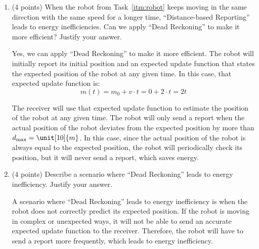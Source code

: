 \documentclass[12pt]{article}
\begin{document}
\begin{ejercicio}[14 points]
\begin{enumerate}[label=\alph*)]
\begin{enumerate}
                    The sleep time is calculated as follows:
                    \begin{equation*}
                        T_3 = \frac{d_{\max} - \text{distance}(m_3, m_{\text{last}})}{v_{\max}} = \frac{10 - 8.75}{4} = \unit[0.3125]{s}
                    \end{equation*}
                    Therefore, the robot will sleep for $T_3 = \unit[0.3125]{s}$, and it will wake up at $t = \unit[4.6875]{s}$.
                \end{enumerate}

                It should be noted however that the robot will not send a report until he reaches the maximum distance of $d_{\max} = \unit[10]{m}$ from the last reported position. Before that, he will only measure his current position and calculate the sleep time.
            \item (4 points) When the robot from Task~\ref{itm:robot} keeps moving in the same direction with the same speed for a longer time, ``Distance-based Reporting'' leads to energy inefficiencies. Can we apply ``Dead Reckoning'' to make it more efficient? Justify your answer.
            
            Yes, we can apply ``Dead Reckoning'' to make it more efficient. The robot will initially report its initial position and an expected update function that states the expected position of the robot at any given time. In this case, that expected update function is:
            $$ m(t) = m_0 + v \cdot t = 0 + 2 \cdot t = 2t $$
            
            The receiver will use that expected update function to estimate the position of the robot at any given time. The robot will only send a report when the actual position of the robot deviates from the expected position by more than $d_{\max} = \unit[10]{m}$. In this case, since the actual position of the robot is always equal to the expected position, the robot will periodically check its position, but it will never send a report, which saves energy.
            \item (4 points) Describe a scenario where ``Dead Reckoning'' leads to energy inefficiency. Justify your answer.
            
            A scenario where ``Dead Reckoning'' leads to energy inefficiency is when the robot does not correctly predict its expected position. If the robot is moving in complex or unexpected ways, it will not be able to send an accurate expected update function to the receiver. Therefore, the robot will have to send a report more frequently, which leads to energy inefficiency.
        \end{enumerate}
    \end{ejercicio}
\end{document}
